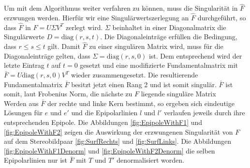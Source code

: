 
Um mit dem Algorithmus weiter verfahren zu können, muss die Singularität in $\hat{F}$ erzwungen werden\cite{HZ}. Hierfür wir eine Singulärwertszerlegung an $\hat{F}$ durchgeführt, so dass $\hat{F}$ in $\hat{F} = U\Sigma V^T$ zerlegt wird. $\Sigma$ beinhaltet in einer Diagonalmatrix die Singulärwerte $D = \text{diag}(r,s,t)$. Die Diagonaleinträge erfüllen die Bedingung, dass $r \leq s \leq t $ gilt. Damit $\hat{F}$ zu einer singulären Matrix wird, muss für die Diagonaleinträge gelten, dass  $\Sigma = \text{diag}(r,s,0)$ ist. Dem entsprechend wird der letzte Eintrag $t$ auf $t = 0$ gesetzt und eine modifizierte Fundamentalmatrix mit $\bar{F} = U\text{diag}(r,s,0)V^T$ wieder zusammengesetzt. Die resultierende Fundamentalmatrix $\bar{F}$ besitzt jetzt einen Rang 2 und ist somit singulär\cite{HZ}. $\bar{F}$ ist somit, laut Frobenius Norm, die nächste zu $F$ liegende singuläre Matrix\cite{HZ}\\

Werden aus $\bar{F}$ der rechte und linke Kern bestimmt, so ergeben sich eindeutige Lösungen für $e$ und $e'$ und die Epipolarlinien $l$ und $l'$ verlaufen jeweils durch ihre entsprechenden Epipole\cite{HZ}. Die Abbildungen \ref{fig:EpipoleWithF1} und \ref{fig:EpipoleWithF2} zeigen die Auswirkung der erzwungenen Singularität von $F$ auf dem Stereobildpaar \ref{fig:SurfRechts} und \ref{fig:SurfLinks}. Die Abbildungen \ref{fig:EpipoleWithF1Denorm} und \ref{fig:EpipoleWithF2Denorm} die selben Epipolarlinien nur ist $\bar{F}$ mit $T$ und $T'$ denormalisiert worden.\\

% 

